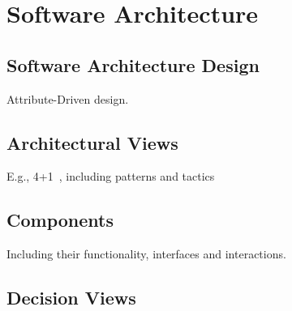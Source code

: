 \chapter{Software Architecture}

\section{Software Architecture Design}

Attribute-Driven design.

\section{Architectural Views}

E.g., 4+1~\cite{kruchten1995}, including patterns and tactics

\section{Components}

Including their functionality, interfaces and interactions.

\section{Decision Views}

